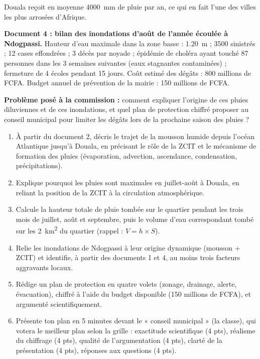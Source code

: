 \documentclass[11pt]{article}
\newcounter{popsec}
\newcounter{popsub}
\newcommand{\courssub}[1]{%
  \stepcounter{popsub}%
  \par\vspace{9pt}\noindent{\popxbold\fontsize{11.5}{13}\selectfont\color{popink}{\color{poporange}\thepopsec.\thepopsub}\hspace{6pt}#1}\par\nopagebreak\vspace{4pt}
}
\begin{document}
Douala reçoit en moyenne \SI{4000}{mm} de pluie par an, ce qui en fait l'une des villes les plus arrosées d'Afrique.

\textbf{Document 4 : bilan des inondations d'août de l'année écoulée à Ndogpassi.} Hauteur d'eau maximale dans la zone basse : \SI{1,20}{m} ; \num{3500} sinistrés ; 12 cases effondrées ; 3 décès par noyade ; épidémie de choléra ayant touché 87 personnes dans les 3 semaines suivantes (eaux stagnantes contaminées) ; fermeture de 4 écoles pendant 15 jours. Coût estimé des dégâts : 800 millions de FCFA. Budget annuel de prévention de la mairie : 150 millions de FCFA.

\textbf{Problème posé à la commission :} comment expliquer l'origine de ces pluies diluviennes et de ces inondations, et quel plan de protection chiffré proposer au conseil municipal pour limiter les dégâts lors de la prochaine saison des pluies ?

\courssub{Consignes}

\begin{enumerate}
\item À partir du document 2, décris le trajet de la mousson humide depuis l'océan Atlantique jusqu'à Douala, en précisant le rôle de la ZCIT et le mécanisme de formation des pluies (évaporation, advection, ascendance, condensation, précipitations).
\item Explique pourquoi les pluies sont maximales en juillet-août à Douala, en reliant la position de la ZCIT à la circulation atmosphérique.
\item Calcule la hauteur totale de pluie tombée sur le quartier pendant les trois mois de juillet, août et septembre, puis le volume d'eau correspondant tombé sur les \SI{2}{km^2} du quartier (rappel : $V = h \times S$).
\item Relie les inondations de Ndogpassi à leur origine dynamique (mousson + ZCIT) et identifie, à partir des documents 1 et 4, au moins trois facteurs aggravants locaux.
\item Rédige un plan de protection en quatre volets (zonage, drainage, alerte, évacuation), chiffré à l'aide du budget disponible (150 millions de FCFA), et argumenté scientifiquement.
\item Présente ton plan en 5 minutes devant le « conseil municipal » (la classe), qui votera le meilleur plan selon la grille : exactitude scientifique (4 pts), réalisme du chiffrage (4 pts), qualité de l'argumentation (4 pts), clarté de la présentation (4 pts), réponses aux questions (4 pts).
\end{enumerate}
\end{document}
